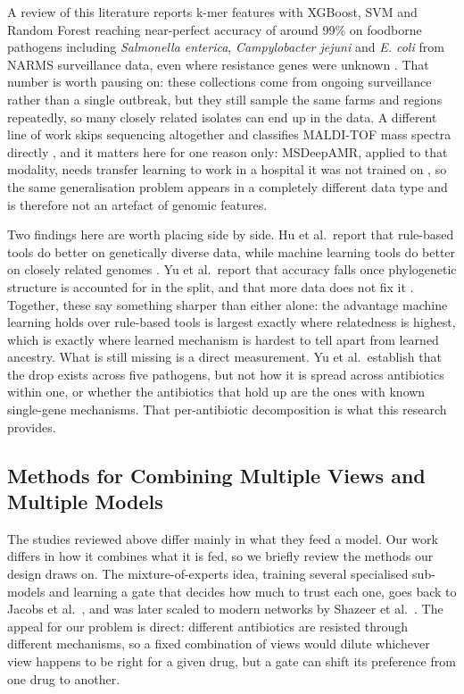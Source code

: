 \vspace{1em}

A review of this literature reports k-mer features with XGBoost, SVM and Random Forest reaching near-perfect accuracy of around 99\% on foodborne pathogens including \textit{Salmonella enterica}, \textit{Campylobacter jejuni} and \textit{E. coli} from NARMS surveillance data, even where resistance genes were unknown \cite{Yun2024}. That number is worth pausing on: these collections come from ongoing surveillance rather than a single outbreak, but they still sample the same farms and regions repeatedly, so many closely related isolates can end up in the data. A different line of work skips sequencing altogether and classifies MALDI-TOF mass spectra directly \cite{weis2022driams}, and it matters here for one reason only: MSDeepAMR, applied to that modality, needs transfer learning to work in a hospital it was not trained on \cite{LopezCortes2024}, so the same generalisation problem appears in a completely different data type and is therefore not an artefact of genomic features.

\vspace{1em}

Two findings here are worth placing side by side. Hu et al.\ report that rule-based tools do better on genetically diverse data, while machine learning tools do better on closely related genomes \cite{Hu2024}. Yu et al.\ report that accuracy falls once phylogenetic structure is accounted for in the split, and that more data does not fix it \cite{Yu2025}. Together, these say something sharper than either alone: the advantage machine learning holds over rule-based tools is largest exactly where relatedness is highest, which is exactly where learned mechanism is hardest to tell apart from learned ancestry. What is still missing is a direct measurement. Yu et al.\ establish that the drop exists across five pathogens, but not how it is spread across antibiotics within one, or whether the antibiotics that hold up are the ones with known single-gene mechanisms. That per-antibiotic decomposition is what this research provides.

\subsection{Methods for Combining Multiple Views and Multiple Models}

The studies reviewed above differ mainly in what they feed a model. Our work differs in how it combines what it is fed, so we briefly review the methods our design draws on. The mixture-of-experts idea, training several specialised sub-models and learning a gate that decides how much to trust each one, goes back to Jacobs et al.\ \cite{jacobs1991moe}, and was later scaled to modern networks by Shazeer et al.\ \cite{shazeer2017moe}. The appeal for our problem is direct: different antibiotics are resisted through different mechanisms, so a fixed combination of views would dilute whichever view happens to be right for a given drug, but a gate can shift its preference from one drug to another.

